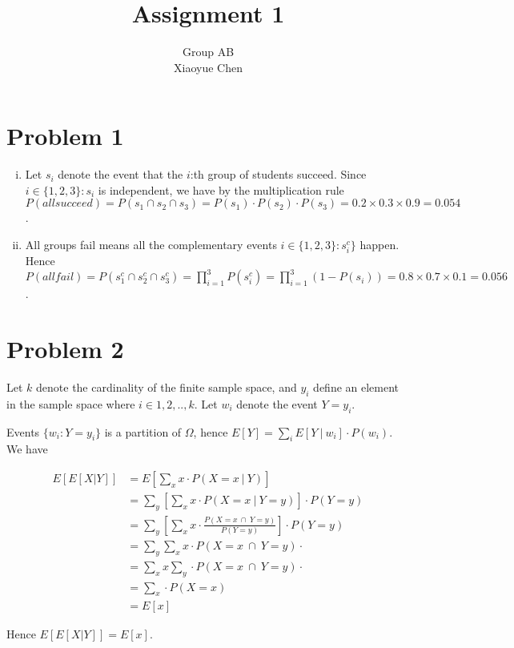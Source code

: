\documentclass{article}
\date{}
\author{Group AB\\Xiaoyue Chen}
\title{Assignment 1}
\begin{document}
\maketitle

\section*{Problem 1}
\begin{enumerate}[(i)]
	\item
	      Let $s_i$ denote the event that the $i$:th
	      group of students succeed. Since $i \in \{1,2,3\}: s_i$ is independent, we have
	      by the multiplication rule $P(\mathit{all succeed}) = P(s_1 \cap s_2 \cap s_3) = P(s_1) \cdot P(s_2) \cdot
		      P(s_3) = 0.2 \times 0.3
		      \times 0.9 = 0.054$.
	\item
	      All groups fail means all the complementary events $i \in \{1,2,3\}: s_i^c\}$
	      happen. Hence $P(\mathit{all fail}) = P(s_1^c \cap s_2^c \cap s_3^c) =
		      \prod_{i=1}^3 P(s_i^c) = \prod_{i=1}^3 (1 - P(s_i)) = 0.8
		      \times 0.7 \times 0.1 = 0.056$.
\end{enumerate}

\section*{Problem 2}
Let $k$ denote the cardinality of the finite sample space, and $y_i$ define an element in the sample space where $i \in 1,2,..,k$. Let $w_i$ denote the event $Y=y_i$.

Events $\{w_i: Y = y_i\}$ is a partition of $\Omega$, hence
$E[ Y ] = \sum_i E[Y ~|~ w_i] \cdot P(w_i)$. We have

\begin{align*}
	E[E[X|Y]] & = E\left[ \sum_x x \cdot P(X=x ~|~ Y) \right]                                       \\
	          & = \sum_y \left[\sum_x x \cdot P(X=x ~|~ Y=y)\right] \cdot P(Y=y)                    \\
	          & = \sum_y \left[\sum_x x \cdot \frac{P(X=x ~\cap~ Y=y)}{P(Y=y)} \right] \cdot P(Y=y) \\
	          & = \sum_y \sum_x x \cdot P(X=x ~\cap~ Y=y) \cdot                                     \\
	          & = \sum_x x \sum_y \cdot P(X=x ~\cap~ Y=y) \cdot                                     \\
	          & = \sum_x \cdot P(X=x)                                                               \\
	          & = E[x]
\end{align*}

Hence $E[E[X|Y]] = E[x]$.
\end{document}
